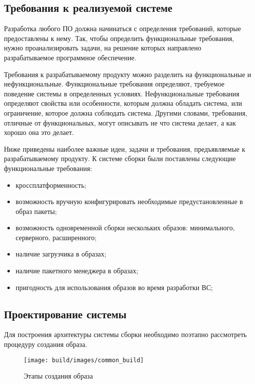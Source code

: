 \subsection{Требования к реализуемой системе}
\label{subsec:build-system-requirements}
Разработка любого ПО должна начинаться с определения требований, которые предоставлены к нему\cite{REQUIREMENTS}.
Так, чтобы определить функциональные требования, нужно проанализировать задачи, на решение которых направлено разрабатываемое программное обеспечение.

Требования к разрабатываемому продукту можно разделить на функциональные и нефункциональные\cite{REQUIREMENTS}.
Функциональные требования определяют, требуемое поведение системы в определенных условиях.
Нефункциональные требования определяют свойства или особенности, которым должна обладать система, или ограничение, которое должна соблюдать система.
Другими словами, требования, отличные от функциональных, могут описывать не что система делает, а как хорошо она это делает\cite{REQUIREMENTS}.

Ниже приведены наиболее важные идеи, задачи и требования, предъявляемые к разрабатываемому продукту.
К системе сборки были поставлены следующие функциональные требования:
\begin{itemize}
  \item кроссплатформенность;
  \item возможность вручную конфигурировать необходимые предустановленные в образ пакеты;
  \item возможность одновременной сборки нескольких образов: минимального, серверного, расширенного;
  \item наличие загрузчика в образах;
  \item наличие пакетного менеджера в образах;
  \item пригодность для использования образов во время разработки ВС;
\end{itemize}
\newpage

\newpage
\subsection{Проектирование системы}
Для построения архитектуры системы сборки необходимо поэтапно рассмотреть процедуру создания образа.

\begin{figure}[h!]
  \centering
  \setlength{\fboxsep}{5pt}
  \texttt{[image: build/images/common\_build]}
  \caption{Этапы создания образа}\label{fig: common_build}
\end{figure}

